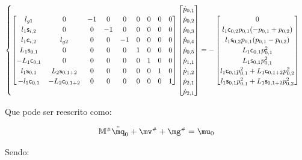 \begin{itemize}
\begin{equation}
\begin{cases}
	\begin{bmatrix}
	l_{g1} & 0 & -1 & 0 & 0 & 0 & 0 & 0 & 0 \\
	l_1 \mathsf{s}_{i,2} & 0 & 0 & -1 & 0 & 0 & 0 & 0 & 0 \\
	l_1 \mathsf{c}_{i,2} & l_{g2}  & 0 & 0 & -1 & 0 & 0 & 0 & 0 \\
	L_1 \mathsf{s}_{0,1} & 0 & 0 & 0 & 0 & 1 & 0 & 0 & 0 \\
	-L_1 \mathsf{c}_{0,1} & 0 & 0 & 0 & 0 & 0 & 1 & 0 & 0 \\
	l_1 \mathsf{s}_{0,1} & L_2 \mathsf{s}_{0,1+2}  & 0 & 0 & 0 & 0 & 0 & 1 & 0 \\
	-l_1 \mathsf{c}_{0,1} & -L_2 \mathsf{c}_{0,1+2} & 0 & 0 & 0 & 0 & 0 & 0 & 1 \\
	\end{bmatrix}
	\begin{bmatrix}
	\dot{p}_{0,1} \\
	\dot{p}_{0,2} \\
	\dot{p}_{0,3} \\
	\dot{p}_{0,4} \\
	\dot{p}_{0,5} \\
	\dot{p}_{1,1} \\
	\dot{p}_{1,2} \\
	\dot{p}_{2,1} \\
	\dot{p}_{2,1} \\
	\end{bmatrix}
	=
	-
	\begin{bmatrix}
	0 \\
	l_1 \mathsf{c}_{0,2} p_{0,1} (-p_{0,1}+p_{0,2}) \\
	l_1 \mathsf{s}_{0,2} p_{0,1} (p_{0,1}-p_{0,2}) \\
	L_1 \mathsf{c}_{0,1} p_{0,1}^2 \\
	L_1 \mathsf{s}_{0,1} p_{0,1}^2 \\
	l_1 \mathsf{c}_{0,1} p_{0,1}^2 + L_1 \mathsf{c}_{0,1+2} p_{0,2}^2  \\
	l_1 \mathsf{s}_{0,1} p_{0,1}^2 + L_1 \mathsf{s}_{0,1+2} p_{0,2}^2 \\
	\end{bmatrix}

	\end{cases}
\end{equation}

Que pode ser reescrito como:

\begin{equation}
	\mM\ssh \ddot{\mq}_0 + \mv\ssh + \mg\ssh = \mu_0
\end{equation}

Sendo:


\end{itemize}
